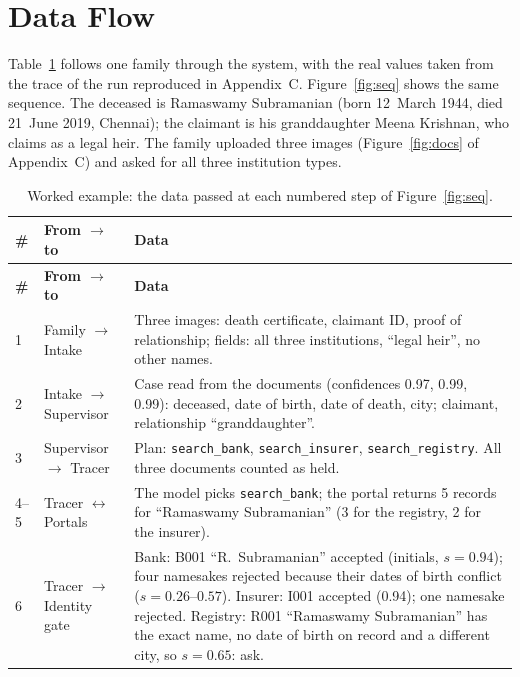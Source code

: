 \section{Data Flow}
Table~\ref{tab:seq} follows one family through the system, with the real values taken from the trace of the run reproduced in Appendix~C. Figure~\ref{fig:seq} shows the same sequence. The deceased is Ramaswamy Subramanian (born 12~March 1944, died 21~June 2019, Chennai); the claimant is his granddaughter Meena Krishnan, who claims as a legal heir. The family uploaded three images (Figure~\ref{fig:docs} of Appendix~C) and asked for all three institution types.





{\footnotesize{}
\renewcommand{\arraystretch}{1.1}
\begin{longtable}{@{}l p{2.5cm} p{9.0cm}@{}}
\caption[Worked example: data at each step]{Worked example: the data passed at each numbered step of Figure~\ref{fig:seq}.}\label{tab:seq}\\
\toprule
\textbf{\#} & \textbf{From $\to$ to} & \textbf{Data} \\ \midrule
\endfirsthead
\toprule
\textbf{\#} & \textbf{From $\to$ to} & \textbf{Data} \\ \midrule
\endhead
1 & Family $\to$ Intake & Three images: death certificate, claimant ID, proof of relationship; fields: all three institutions, ``legal heir'', no other names. \\
2 & Intake $\to$ Supervisor & Case read from the documents (confidences 0.97, 0.99, 0.99): deceased, date of birth, date of death, city; claimant, relationship ``granddaughter''. \\
3 & Supervisor $\to$ Tracer & Plan: \texttt{search\_bank}, \texttt{search\_insurer}, \texttt{search\_registry}. All three documents counted as held. \\
4--5 & Tracer $\leftrightarrow$ Portals & The model picks \texttt{search\_bank}; the portal returns 5 records for ``Ramaswamy Subramanian'' (3 for the registry, 2 for the insurer). \\
6 & Tracer $\to$ Identity gate & Bank: B001 ``R.\ Subramanian'' accepted (initials, $s=0.94$); four namesakes rejected because their dates of birth conflict ($s=0.26$--$0.57$). Insurer: I001 accepted (0.94); one namesake rejected. Registry: R001 ``Ramaswamy Subramanian'' has the exact name, no date of birth on record and a different city, so $s=0.65$: ask. \\

\end{longtable}}
